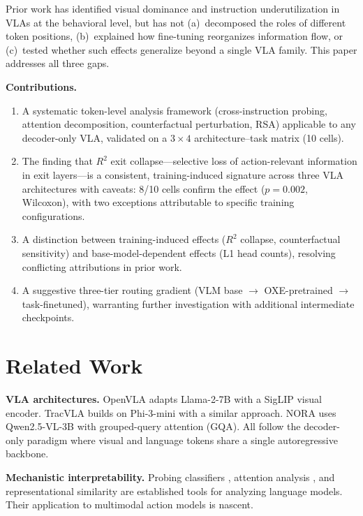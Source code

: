 \documentclass[10pt,twocolumn]{article}
\begin{document}
Prior work has identified visual dominance and instruction underutilization in VLAs at the behavioral level, but has not (a)~decomposed the roles of different token positions, (b)~explained how fine-tuning reorganizes information flow, or (c)~tested whether such effects generalize beyond a single VLA family. This paper addresses all three gaps.

\textbf{Contributions.}
\begin{enumerate}[nosep,leftmargin=*]
  \item A systematic token-level analysis framework (cross-instruction probing, attention decomposition, counterfactual perturbation, RSA) applicable to any decoder-only VLA, validated on a $3 \times 4$ architecture--task matrix (10 cells).
  \item The finding that $R^2$ exit collapse---selective loss of action-relevant information in exit layers---is a consistent, training-induced signature across three VLA architectures with caveats: 8/10 cells confirm the effect ($p=0.002$, Wilcoxon), with two exceptions attributable to specific training configurations.
  \item A distinction between training-induced effects ($R^2$ collapse, counterfactual sensitivity) and base-model-dependent effects (L1 head counts), resolving conflicting attributions in prior work.
  \item A suggestive three-tier routing gradient (VLM base $\to$ OXE-pretrained $\to$ task-finetuned), warranting further investigation with additional intermediate checkpoints.
\end{enumerate}

\section{Related Work}
\label{sec:related}

\textbf{VLA architectures.}
OpenVLA \cite{openvla} adapts Llama-2-7B with a SigLIP visual encoder. TracVLA \cite{tracvla} builds on Phi-3-mini with a similar approach. NORA \cite{nora} uses Qwen2.5-VL-3B with grouped-query attention (GQA). All follow the decoder-only paradigm where visual and language tokens share a single autoregressive backbone.

\textbf{Mechanistic interpretability.}
Probing classifiers \cite{belinkov2022probing}, attention analysis \cite{clark2019bertlook}, and representational similarity \cite{kriegeskorte2008rsa} are established tools for analyzing language models. Their application to multimodal action models is nascent.
\end{document}
